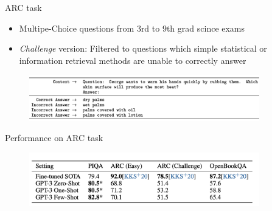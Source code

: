 
\begin{vbframe}{ARC task}

\vfill

\begin{itemize}
	\item Multipe-Choice questions from 3rd to 9th grad scince exams
	\item \textit{Challenge} version: Filtered to questions which simple statistical or information retrieval methods are unable to correctly answer
\end{itemize}

	\begin{figure}
		\centering
		\includegraphics[width=10cm]{figure/arcformat.png}\\
	\end{figure}

\vfill

\end{vbframe}



\begin{vbframe}{Performance on ARC task}

\vfill

	\begin{figure}
		\centering
		\includegraphics[width=10cm]{figure/arcperf.png}
	\end{figure}

\vfill

\end{vbframe}



